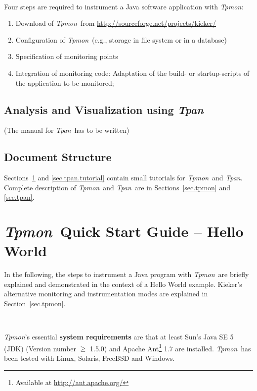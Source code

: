 \documentclass[a4paper,12pt]{scrartcl}
\newcommand{\tpmon}{\textit{Tpmon}}
\newcommand{\tpan}{\textit{Tpan}}
\newcommand{\kiekerurl}{\small\url{http://sourceforge.net/projects/kieker/}\normalsize}
\begin{document}
\

Four steps are required to instrument a Java software application with \tpmon:
\begin{enumerate}
\item Download of \tpmon\ from \kiekerurl
\item Configuration of \tpmon\  (e.g., storage in file system or in a database)
\item Specification of monitoring points 
\item Integration of monitoring code: Adaptation of the build- or startup-scripts of the application to be monitored; 
\end{enumerate}

\subsection{Analysis and Visualization using \tpan}

(The manual for \tpan\ has to be written)

\subsection{Document Structure}

Sections~\ref{sec.tpmon.tutorial} and \ref{sec.tpan.tutorial} contain small tutorials for \tpmon\ and \tpan. Complete description of \tpmon\ and \tpan\ are in Sections~\ref{sec.tpmon} and \ref{sec.tpan}. %

\section{\tpmon\ Quick Start Guide -- Hello World}\label{sec.tpmon.tutorial}
In the following, the steps to instrument a Java program with \tpmon\ are briefly explained and demonstrated in the context of a Hello World example. Kieker's alternative monitoring and instrumentation modes are explained in Section~\ref{sec.tpmon}.

\

\tpmon's essential \textbf{system requirements} are that at least Sun's Java SE 5 (JDK) (Version number $\geq$ 1.5.0) and Apache Ant\footnote{Available at \url{http://ant.apache.org/}} 1.7 are installed. \tpmon\ has been tested with Linux, Solaris, FreeBSD and Windows.
\end{document}
